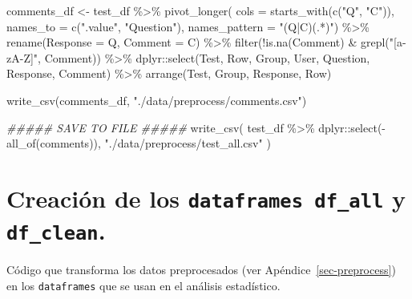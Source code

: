 \documentclass[
  12pt,
  a4paper,
  extrafontsizes,
  onecolumn,
  openright]{memoir}
\newenvironment{Shaded}{\begin{snugshade}}{\end{snugshade}}
\newcommand{\AttributeTok}[1]{\textcolor[rgb]{0.40,0.45,0.13}{#1}}
\newcommand{\DocumentationTok}[1]{\textcolor[rgb]{0.37,0.37,0.37}{\textit{#1}}}
\newcommand{\FunctionTok}[1]{\textcolor[rgb]{0.28,0.35,0.67}{#1}}
\newcommand{\NormalTok}[1]{\textcolor[rgb]{0.00,0.23,0.31}{#1}}
\newcommand{\OtherTok}[1]{\textcolor[rgb]{0.00,0.23,0.31}{#1}}
\newcommand{\SpecialCharTok}[1]{\textcolor[rgb]{0.37,0.37,0.37}{#1}}
\newcommand{\StringTok}[1]{\textcolor[rgb]{0.13,0.47,0.30}{#1}}
\begin{document}
\begin{Shaded}
\begin{Highlighting}[]
\NormalTok{comments\_df }\OtherTok{\textless{}{-}}\NormalTok{ test\_df }\SpecialCharTok{\%\textgreater{}\%}
    \FunctionTok{pivot\_longer}\NormalTok{(}
        \AttributeTok{cols =} \FunctionTok{starts\_with}\NormalTok{(}\FunctionTok{c}\NormalTok{(}\StringTok{"Q"}\NormalTok{, }\StringTok{"C"}\NormalTok{)),}
        \AttributeTok{names\_to =} \FunctionTok{c}\NormalTok{(}\StringTok{".value"}\NormalTok{, }\StringTok{"Question"}\NormalTok{),}
        \AttributeTok{names\_pattern =} \StringTok{"(Q|C)(.*)"}\NormalTok{) }\SpecialCharTok{\%\textgreater{}\%}
    \FunctionTok{rename}\NormalTok{(}\AttributeTok{Response =}\NormalTok{ Q, }\AttributeTok{Comment =}\NormalTok{ C) }\SpecialCharTok{\%\textgreater{}\%}
    \FunctionTok{filter}\NormalTok{(}\SpecialCharTok{!}\FunctionTok{is.na}\NormalTok{(Comment) }\SpecialCharTok{\&} \FunctionTok{grepl}\NormalTok{(}\StringTok{"[a{-}zA{-}Z]"}\NormalTok{, Comment)) }\SpecialCharTok{\%\textgreater{}\%}
\NormalTok{    dplyr}\SpecialCharTok{::}\FunctionTok{select}\NormalTok{(Test, Row, Group, User, Question, Response, Comment) }\SpecialCharTok{\%\textgreater{}\%}
    \FunctionTok{arrange}\NormalTok{(Test, Group, Response, Row)}


\FunctionTok{write\_csv}\NormalTok{(comments\_df, }\StringTok{"./data/preprocess/comments.csv"}\NormalTok{)}

\DocumentationTok{\#\#\#\#\# SAVE TO FILE \#\#\#\#\#}
\FunctionTok{write\_csv}\NormalTok{(}
\NormalTok{    test\_df }\SpecialCharTok{\%\textgreater{}\%}\NormalTok{ dplyr}\SpecialCharTok{::}\FunctionTok{select}\NormalTok{(}\SpecialCharTok{{-}}\FunctionTok{all\_of}\NormalTok{(comments)), }\StringTok{"./data/preprocess/test\_all.csv"}
\NormalTok{)}
\end{Highlighting}
\end{Shaded}

\normalsize

\hypertarget{sec-setup}{%
\chapter{\texorpdfstring{Creación de los \texttt{dataframes\ df\_all} y
\texttt{df\_clean}.}{Creación de los dataframes df\_all y df\_clean.}}\label{sec-setup}}

Código que transforma los datos preprocesados (ver
Apéndice~\ref{sec-preprocess}) en los \texttt{dataframes} que se usan en
el análisis estadístico.

\scriptsize
\end{document}
